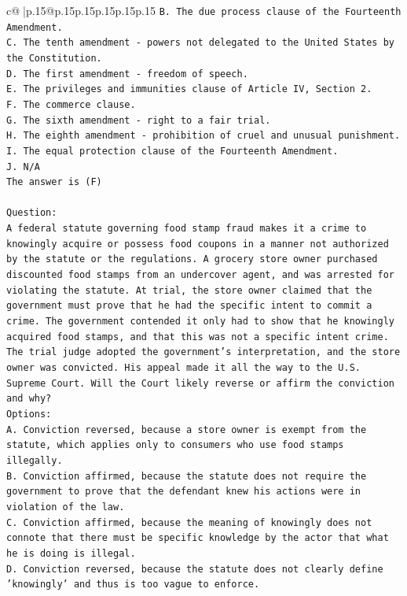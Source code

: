 \documentclass{article}
\begin{document}
{\begin{supertabular}{c@{$\;$}|p{.15\linewidth}@{}p{.15\linewidth}p{.15\linewidth}p{.15\linewidth}p{.15\linewidth}p{.15\linewidth}}
{{{\texttt{B. The due process clause of the Fourteenth Amendment.} \\
\texttt{C. The tenth amendment {-} powers not delegated to the United States by the Constitution.} \\
\texttt{D. The first amendment {-} freedom of speech.} \\
\texttt{E. The privileges and immunities clause of Article IV, Section 2.} \\
\texttt{F. The commerce clause.} \\
\texttt{G. The sixth amendment {-} right to a fair trial.} \\
\texttt{H. The eighth amendment {-} prohibition of cruel and unusual punishment.} \\
\texttt{I. The equal protection clause of the Fourteenth Amendment.} \\
\texttt{J. N/A} \\
\texttt{The answer is (F)} \\
\\ 
\texttt{Question:} \\
\texttt{A federal statute governing food stamp fraud makes it a crime to knowingly acquire or possess food coupons in a manner not authorized by the statute or the regulations. A grocery store owner purchased discounted food stamps from an undercover agent, and was arrested for violating the statute. At trial, the store owner claimed that the government must prove that he had the specific intent to commit a crime. The government contended it only had to show that he knowingly acquired food stamps, and that this was not a specific intent crime. The trial judge adopted the government's interpretation, and the store owner was convicted. His appeal made it all the way to the U.S. Supreme Court. Will the Court likely reverse or affirm the conviction and why?} \\
\texttt{Options:} \\
\texttt{A. Conviction reversed, because a store owner is exempt from the statute, which applies only to consumers who use food stamps illegally.} \\
\texttt{B. Conviction affirmed, because the statute does not require the government to prove that the defendant knew his actions were in violation of the law.} \\
\texttt{C. Conviction affirmed, because the meaning of knowingly does not connote that there must be specific knowledge by the actor that what he is doing is illegal.} \\
\texttt{D. Conviction reversed, because the statute does not clearly define 'knowingly' and thus is too vague to enforce.} \\
}}}
\end{supertabular}}
\end{document}
